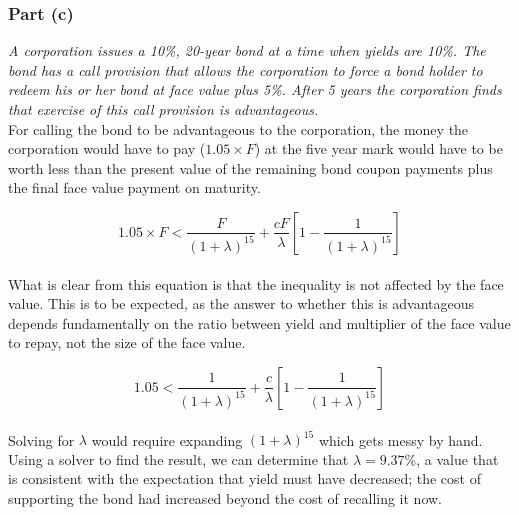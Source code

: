 \documentclass[11pt]{article}
\begin{document}
\subsubsection*{Part (c)}

\textit{A corporation issues a 10\%, 20-year bond at a time when yields are 10\%. The
bond has a call provision that allows the corporation to force a bond holder to
redeem his or her bond at face value plus 5\%. After 5 years the corporation
finds that exercise of this call provision is advantageous.}\\

For calling the bond to be advantageous to the corporation, the money the corporation
would have to pay ($1.05 \times F$) at the five year mark would have to be worth less
than the present value of the remaining bond coupon payments plus the final face value
payment on maturity.

\[ 1.05 \times F < \frac{F}{\left(1+\lambda\right)^{15}} + \frac{cF}{\lambda}\left[1 - \frac{1}{\left(1+\lambda\right)^{15}}\right] \] \\

What is clear from this equation is that the inequality is not affected by the face
value. This is to be expected, as the answer to whether this is advantageous depends
fundamentally on the ratio between yield and multiplier of the face value to repay,
not the size of the face value.

\[ 1.05 < \frac{1}{\left(1+\lambda\right)^{15}} + \frac{c}{\lambda}\left[1 - \frac{1}{\left(1+\lambda\right)^{15}}\right] \] \\

Solving for $\lambda$ would require expanding $(1 + \lambda)^{15}$ which gets
messy by hand. Using a solver to find the result, we can determine that
$\lambda = 9.37\%$, a value that is consistent with the expectation that yield
must have decreased; the cost of supporting the bond had increased beyond the
cost of recalling it now.
\end{document}
